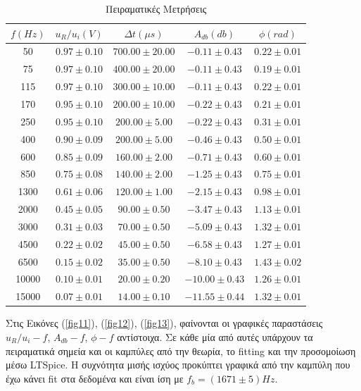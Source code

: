 \documentclass[a4paper]{article}
\begin{document}
		\begin{table}[h!]
			\centering
			\begin{tabular}{c|c|c||c|c|}
			$f(Hz)$ & $u_R/u_i(V)$ & $\Delta t(\mu s)$ & $A_{db}(db)$ & $\phi(rad)$ \\
			\hline\hline
50 & $0.97 \pm 0.10$ & $700.00 \pm 20.00$ & $-0.11 \pm 0.43$ & $0.22 \pm 0.01$\\
75 & $0.97 \pm 0.10$ & $400.00 \pm 20.00$ & $-0.11 \pm 0.43$ & $0.19 \pm 0.01$\\
115 & $0.97 \pm 0.10$ & $300.00 \pm 10.00$ & $-0.11 \pm 0.43$ & $0.22 \pm 0.01$\\
170 & $0.95 \pm 0.10$ & $200.00 \pm 10.00$ & $-0.22 \pm 0.43$ & $0.21 \pm 0.01$\\
250 & $0.95 \pm 0.10$ & $200.00 \pm 5.00$ & $-0.22 \pm 0.43$ & $0.31 \pm 0.01$\\
400 & $0.90 \pm 0.09$ & $200.00 \pm 5.00$ & $-0.46 \pm 0.43$ & $0.50 \pm 0.01$\\
600 & $0.85 \pm 0.09$ & $160.00 \pm 2.00$ & $-0.71 \pm 0.43$ & $0.60 \pm 0.01$\\
850 & $0.75 \pm 0.08$ & $140.00 \pm 2.00$ & $-1.25 \pm 0.43$ & $0.75 \pm 0.01$\\
1300 & $0.61 \pm 0.06$ & $120.00 \pm 1.00$ & $-2.15 \pm 0.43$ & $0.98 \pm 0.01$\\
2000 & $0.45 \pm 0.05$ & $90.00 \pm 0.50$ & $-3.47 \pm 0.43$ & $1.13 \pm 0.01$\\
3000 & $0.31 \pm 0.03$ & $70.00 \pm 0.50$ & $-5.09 \pm 0.43$ & $1.32 \pm 0.01$\\
4500 & $0.22 \pm 0.02$ & $45.00 \pm 0.50$ & $-6.58 \pm 0.43$ & $1.27 \pm 0.01$\\
6500 & $0.15 \pm 0.02$ & $35.00 \pm 0.50$ & $-8.10 \pm 0.43$ & $1.43 \pm 0.02$\\
10000 & $0.10 \pm 0.01$ & $20.00 \pm 0.20$ & $-10.00 \pm 0.43$ & $ 1.26 \pm 0.01$\\
15000 & $0.07 \pm 0.01$ & $14.00 \pm 0.10$ & $-11.55 \pm 0.44$ & $ 1.32 \pm 0.01$
			\end{tabular}
			\caption{Πειραματικές Μετρήσεις}
			\label{tab2}
		\end{table}		

\newpage

Στις Εικόνες (\ref{fig11}), (\ref{fig12}), (\ref{fig13}), φαίνονται οι γραφικές παραστάσεις $u_R/u_i - f$, $A_{db} - f$, $\phi - f$ αντίστοιχα. Σε κάθε μία από αυτές υπάρχουν τα πειραματικά σημεία και οι καμπύλες από την θεωρία, το fitting και την προσομοίωση μέσω LTSpice. 
		Η συχνότητα μισής ισχύος προκύπτει γραφικά από την καμπύλη που έχω κάνει fit στα δεδομένα και είναι ίση με $f_b = (1671\pm 5)Hz$.
\end{document}
